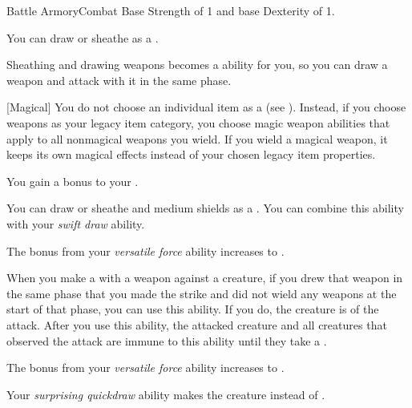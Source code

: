     \begin{feat}{Battle Armory}{Combat}
        \featpre Base Strength of 1 and base Dexterity of 1.

         You can draw or sheathe  as a .

         Sheathing and drawing weapons becomes a  ability for you, so you can draw a weapon and attack with it in the same phase.

        [Magical] You do not choose an individual item as a  (see ).
        Instead, if you choose weapons as your legacy item category, you choose magic weapon abilities that apply to all nonmagical weapons you wield.
        If you wield a magical weapon, it keeps its own magical effects instead of your chosen legacy item properties.

         You gain a  bonus to your .

         You can draw or sheathe  and medium shields as a .
        You can combine this ability with your \textit{swift draw} ability.

         The bonus from your \textit{versatile force} ability increases to .

         When you make a  with a weapon against a creature, if you drew that weapon in the same phase that you made the strike and did not wield any weapons at the start of that phase, you can use this ability.
        If you do, the creature is \partiallyunaware of the attack.
        After you use this ability, the attacked creature and all creatures that observed the attack are immune to this ability until they take a .

         The bonus from your \textit{versatile force} ability increases to .

         Your \textit{surprising quickdraw} ability makes the creature \unaware instead of \partiallyunaware.
    \end{feat}

